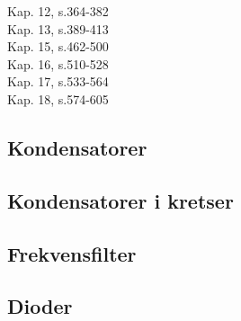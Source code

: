 Kap. 12, s.364-382 \\
Kap. 13, s.389-413 \\
Kap. 15, s.462-500 \\
Kap. 16, s.510-528 \\
Kap. 17, s.533-564 \\
Kap. 18, s.574-605

\subsection{Kondensatorer}


\subsection{Kondensatorer i kretser}


\subsection{Frekvensfilter}


\subsection{Dioder}

